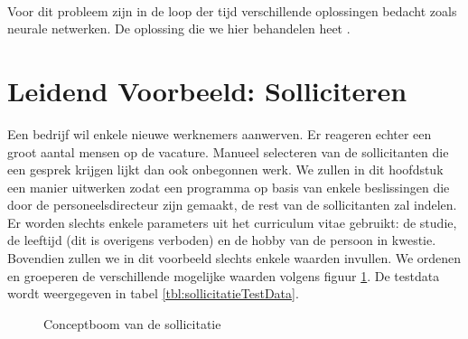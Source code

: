\paragraph{}
Voor dit probleem zijn in de loop der tijd verschillende oplossingen bedacht zoals neurale netwerken. De oplossing die we hier behandelen heet .
\section{Leidend Voorbeeld: Solliciteren}
\begin{leftbar}
Een bedrijf wil enkele nieuwe werknemers aanwerven. Er reageren echter een groot aantal mensen op de vacature. Manueel selecteren van de sollicitanten die een gesprek krijgen lijkt dan ook onbegonnen werk. We zullen in dit hoofdstuk een manier uitwerken zodat een programma op basis van enkele beslissingen die door de personeelsdirecteur zijn gemaakt, de rest van de sollicitanten zal indelen. Er worden slechts enkele parameters uit het curriculum vitae gebruikt: de studie, de leeftijd (dit is overigens verboden) en de hobby van de persoon in kwestie. Bovendien zullen we in dit voorbeeld slechts enkele waarden invullen. We ordenen en groeperen de verschillende mogelijke waarden volgens figuur \ref{fig:sollicitatieConceptTree}. De testdata wordt weergegeven in tabel \ref{tbl:sollicitatieTestData}.
\end{leftbar}
\begin{figure}[htb]
\centering
{}
\caption{Conceptboom van de sollicitatie}
\label{fig:sollicitatieConceptTree}
\end{figure}
